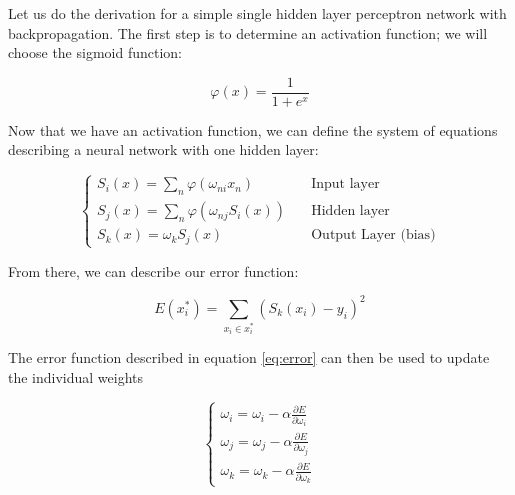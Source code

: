 \documentclass[a4paper]{comjnl}
\numberwithin{equation}{subsection}
\begin{document}
            Let us do the derivation for a simple single hidden layer perceptron network with
            backpropagation. The first step is to determine an activation function; we will choose
            the sigmoid function:

            \begin{equation}\label{eq:act}
                \varphi(x)=\frac{1}{1+e^x}
            \end{equation}

            \noindent Now that we have an activation function, we can define the system of equations
            describing a neural network with one hidden layer:

            \begin{equation}\label{eq:basicnnet}
                \begin{cases}
                    S_i(x)=\sum_n \varphi(\omega_{ni}x_n) & \quad \text{Input layer} \\
                    S_j(x)=\sum_n \varphi(\omega_{nj}S_i(x)) & \quad \text{Hidden layer} \\
                    S_k(x)=\omega_kS_j(x) & \quad \text{Output Layer (bias)}
                \end{cases}
            \end{equation}

            \noindent From there, we can describe our error function:

            \begin{equation}\label{eq:error}
                E(x_i^*) = \sum_{x_i \in x_i^*} (S_k(x_i)-y_i)^2
            \end{equation}

            \noindent The error function described in equation \eqref{eq:error} can then be used to
            update the individual weights

            \begin{equation}\label{eq:update}
                \begin{cases}
                    \omega_i = \omega_i - \alpha\frac{\partial E}{\partial \omega_i} \\
                    \omega_j = \omega_j - \alpha\frac{\partial E}{\partial \omega_j} \\
                    \omega_k = \omega_k - \alpha\frac{\partial E}{\partial \omega_k}
                \end{cases}
            \end{equation}
\end{document}
